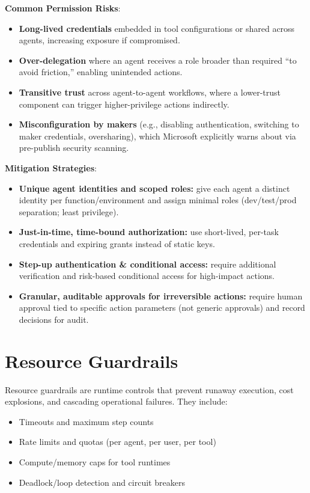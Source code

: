 \begin{TNtwocol}
    \textbf{Common Permission Risks}:
    \begin{itemize}
        \item \textbf{Long-lived credentials} embedded in tool configurations or shared across agents, increasing exposure if compromised.
        \item \textbf{Over-delegation} where an agent receives a role broader than required “to avoid friction,” enabling unintended actions.
        \item \textbf{Transitive trust} across agent-to-agent workflows, where a lower-trust component can trigger higher-privilege actions indirectly.
        \item \textbf{Misconfiguration by makers} (e.g., disabling authentication, switching to maker credentials, oversharing), which Microsoft explicitly warns about via pre-publish security scanning.
    \end{itemize}

    \textbf{Mitigation Strategies}:
    \begin{itemize}
        \item \textbf{Unique agent identities and scoped roles:} give each agent a distinct identity per function/environment and assign minimal roles (dev/test/prod separation; least privilege).
        \item \textbf{Just-in-time, time-bound authorization:} use short-lived, per-task credentials and expiring grants instead of static keys.
        \item \textbf{Step-up authentication \& conditional access:} require additional verification and risk-based conditional access for high-impact actions.
        \item \textbf{Granular, auditable approvals for irreversible actions:} require human approval tied to specific action parameters (not generic approvals) and record decisions for audit.
    \end{itemize}


    \section{Resource Guardrails}

    Resource guardrails are runtime controls that prevent runaway execution, cost explosions, and cascading operational failures. They include:

    \begin{itemize}
        \item Timeouts and maximum step counts
        \item Rate limits and quotas (per agent, per user, per tool)
        \item Compute/memory caps for tool runtimes
        \item Deadlock/loop detection and circuit breakers
    \end{itemize}


\end{TNtwocol}
